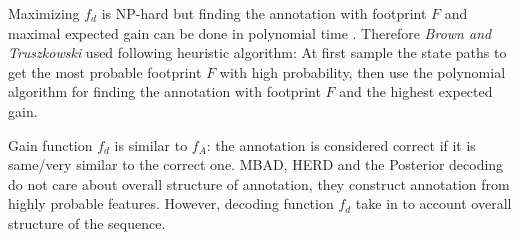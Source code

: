 Maximizing $f_d$ is NP-hard but finding the  annotation with footprint $F$ and
maximal expected gain can be done in polynomial time \cite{Brown2010}. Therefore
{\it Brown and Truszkowski} used following heuristic algorithm: At first 
sample the state paths to get the most probable footprint $F$ with high probability,
then use the
polynomial algorithm for finding the annotation with footprint $F$ and the highest expected gain.

Gain function $f_d$ is similar to $f_A$: the annotation is considered correct if
it is same/very similar to the correct one. MBAD, HERD and the
Posterior decoding do not care about overall structure of annotation, they
construct annotation from highly probable features. However,
decoding function $f_d$ take in to account
overall structure of the sequence.
